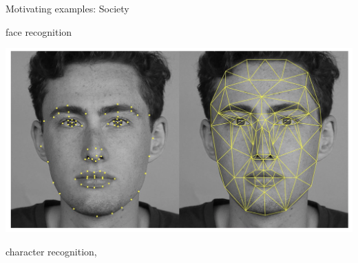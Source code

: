 \documentclass[mathserif, aspectratio=169]{beamer}
\begin{document}
\begin{frame}{Motivating examples: Society}

face recognition

\includegraphics[scale=0.25]{murray_hackernoon_2017_face}

character recognition, 


\end{frame}
\end{document}
